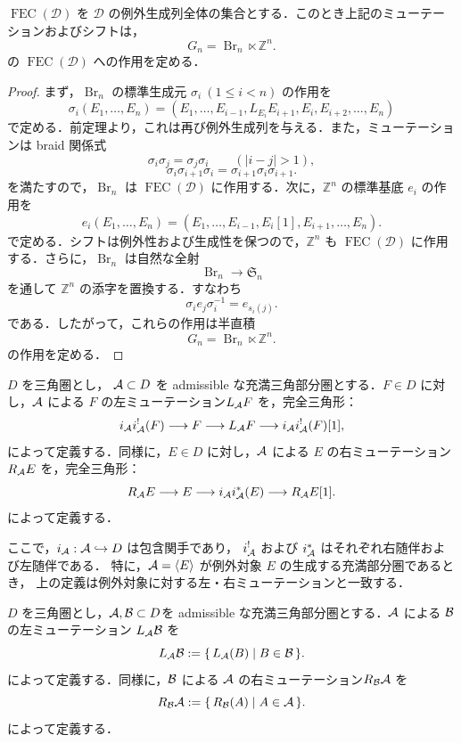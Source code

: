 \begin{prop}
$\operatorname{FEC}(\mathcal D)$ を $\mathcal D$ の例外生成列全体の集合とする．このとき上記のミューテーションおよびシフトは，
\[
G_n=\operatorname{Br}_n\ltimes \mathbb Z^n.
\]
の $\operatorname{FEC}(\mathcal D)$ への作用を定める．
\end{prop}

\begin{proof}
まず，$\operatorname{Br}_n$ の標準生成元 $\sigma_i\ (1\le i<n)$ の作用を
\[
\sigma_i(E_1,\dots,E_n)
=
(E_1,\dots,E_{i-1},L_{E_i}E_{i+1},E_i,E_{i+2},\dots,E_n)
\]
で定める．前定理より，これは再び例外生成列を与える．また，ミューテーションは braid 関係式
\[
\sigma_i\sigma_j=\sigma_j\sigma_i
\qquad (|i-j|>1),
\]
\[
\sigma_i\sigma_{i+1}\sigma_i
=
\sigma_{i+1}\sigma_i\sigma_{i+1}.
\]
を満たすので，$\operatorname{Br}_n$ は $\operatorname{FEC}(\mathcal D)$ に作用する．次に，$\mathbb Z^n$ の標準基底 $e_i$ の作用を
\[
e_i(E_1,\dots,E_n)
=
(E_1,\dots,E_{i-1},E_i[1],E_{i+1},\dots,E_n).
\]
で定める．シフトは例外性および生成性を保つので，$\mathbb Z^n$ も
$\operatorname{FEC}(\mathcal D)$ に作用する．さらに，$\operatorname{Br}_n$ は自然な全射
\[
\operatorname{Br}_n\longrightarrow \mathfrak S_n
\]
を通して $\mathbb Z^n$ の添字を置換する．すなわち
\[
\sigma_i e_j\sigma_i^{-1}=e_{s_i(j)}.
\]
である．したがって，これらの作用は半直積
\[
G_n=\operatorname{Br}_n\ltimes \mathbb Z^n.
\]
の作用を定める．
\end{proof}

\begin{defn}
$D$ を三角圏とし，
${\mathcal A}\subset D$ を admissible な充満三角部分圏とする．$F\in D$ に対し，${\mathcal A}$ による $F$ の左ミューテーション$L_{{\mathcal A}}F$ を，完全三角形：
\[
i_{{\mathcal A}}i_{{\mathcal A}}^{!}(F)
\longrightarrow
F
\longrightarrow
L_{{\mathcal A}}F
\longrightarrow
i_{{\mathcal A}}i_{{\mathcal A}}^{!}(F)[1],
\]
によって定義する．同様に，$E\in D$ に対し，${\mathcal A}$ による $E$ の右ミューテーション$R_{{\mathcal A}}E$ を，完全三角形：
\[
R_{{\mathcal A}}E
\longrightarrow
E
\longrightarrow
i_{{\mathcal A}}i_{{\mathcal A}}^{*}(E)
\longrightarrow
R_{{\mathcal A}}E[1].
\]
によって定義する．
\end{defn}
ここで，$i_{{\mathcal A}}: {\mathcal A}\hookrightarrow D$ は包含関手であり，
$i_{{\mathcal A}}^{!}$ および $i_{{\mathcal A}}^{*}$ はそれぞれ右随伴および左随伴である．
特に，${\mathcal A}=\langle E\rangle$ が例外対象 $E$ の生成する充満部分圏であるとき，
上の定義は例外対象に対する左・右ミューテーションと一致する．
\begin{defn}
$D$ を三角圏とし，${\mathcal A},{\mathcal B}\subset D$を admissible な充満三角部分圏とする．${\mathcal A}$ による ${\mathcal B}$ の左ミューテーション
$L_{{\mathcal A}}{\mathcal B}$ を
\[
L_{{\mathcal A}}{\mathcal B}
:=
\{\,L_{{\mathcal A}}(B)\mid B\in{\mathcal B}\,\}.
\]
によって定義する．同様に，${\mathcal B}$ による ${\mathcal A}$ の右ミューテーション$R_{{\mathcal B}}{\mathcal A}$ を
\[
R_{{\mathcal B}}{\mathcal A}
:=
\{\,R_{{\mathcal B}}(A)\mid A\in{\mathcal A}\,\}.
\]
によって定義する．
\end{defn}
